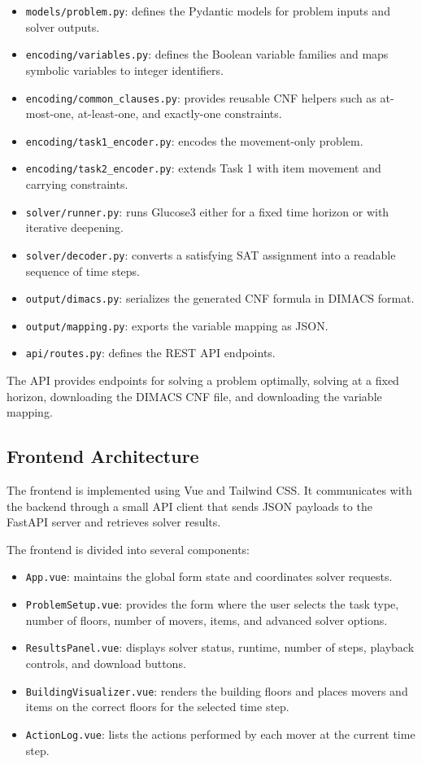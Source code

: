 \begin{itemize}
    \item \texttt{models/problem.py}: defines the Pydantic models for problem inputs and solver outputs.
    \item \texttt{encoding/variables.py}: defines the Boolean variable families and maps symbolic variables to integer identifiers.
    \item \texttt{encoding/common\_clauses.py}: provides reusable CNF helpers such as at-most-one, at-least-one, and exactly-one constraints.
    \item \texttt{encoding/task1\_encoder.py}: encodes the movement-only problem.
    \item \texttt{encoding/task2\_encoder.py}: extends Task 1 with item movement and carrying constraints.
    \item \texttt{solver/runner.py}: runs Glucose3 either for a fixed time horizon or with iterative deepening.
    \item \texttt{solver/decoder.py}: converts a satisfying SAT assignment into a readable sequence of time steps.
    \item \texttt{output/dimacs.py}: serializes the generated CNF formula in DIMACS format.
    \item \texttt{output/mapping.py}: exports the variable mapping as JSON\@.
    \item \texttt{api/routes.py}: defines the REST API endpoints.
\end{itemize}

\noindent The API provides endpoints for solving a problem optimally, solving at a fixed horizon, downloading the DIMACS CNF file, and downloading the variable mapping.

\subsection{Frontend Architecture} \label{subsec:frontend-architecture}

The frontend is implemented using Vue and Tailwind CSS\@.
It communicates with the backend through a small API client that sends JSON payloads to the FastAPI server and retrieves solver results.

\noindent The frontend is divided into several components:

\begin{itemize}
    \item \texttt{App.vue}: maintains the global form state and coordinates solver requests.
    \item \texttt{ProblemSetup.vue}: provides the form where the user selects the task type, number of floors, number of movers, items, and advanced solver options.
    \item \texttt{ResultsPanel.vue}: displays solver status, runtime, number of steps, playback controls, and download buttons.
    \item \texttt{BuildingVisualizer.vue}: renders the building floors and places movers and items on the correct floors for the selected time step.
    \item \texttt{ActionLog.vue}: lists the actions performed by each mover at the current time step.
\end{itemize}

